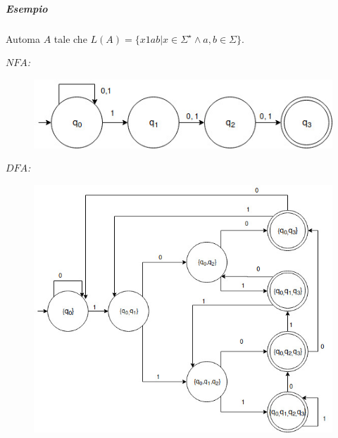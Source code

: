 \subparagraph{Esempio}
Automa $A$ tale che $L(A) = \{x1ab | x 	\in \Sigma^{\star}\land a, b \in \Sigma \}$.
\begin{description}
	\item \emph{$NFA$:}
		\begin{figure}[H]
			\includegraphics[scale=0.6]{nfadfa}
		\end{figure}
	\item \emph{$DFA$:}
		\begin{figure}[H]
			\includegraphics[scale=0.6]{nfadfa2}
		\end{figure}
\end{description}
